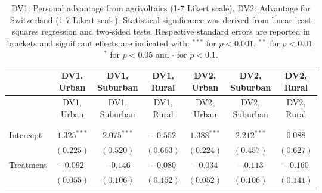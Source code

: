 
\begin{center}
\begin{small}
\begin{longtable}{l@{} c@{} c@{} c@{} c@{} c@{} c@{}}
\hline
 & \shortstack{\rule{0pt}{2.2ex}DV1,\\Urban} & \shortstack{\rule{0pt}{2.2ex}DV1,\\Suburban} & \shortstack{\rule{0pt}{2.2ex}DV1,\\Rural} & \shortstack{\rule{0pt}{2.2ex}DV2,\\Urban} & \shortstack{\rule{0pt}{2.2ex}DV2,\\Suburban} & \shortstack{\rule{0pt}{2.2ex}DV2,\\Rural} \\
\hline
\endfirsthead
\hline
 & \shortstack{\rule{0pt}{2.2ex}DV1,\\Urban} & \shortstack{\rule{0pt}{2.2ex}DV1,\\Suburban} & \shortstack{\rule{0pt}{2.2ex}DV1,\\Rural} & \shortstack{\rule{0pt}{2.2ex}DV2,\\Urban} & \shortstack{\rule{0pt}{2.2ex}DV2,\\Suburban} & \shortstack{\rule{0pt}{2.2ex}DV2,\\Rural} \\
\hline
\endhead
\hline
\endfoot
\hline
\multicolumn{7}{l}{\tiny{
}}\\
\caption{DV1: Personal advantage from agrivoltaics (1-7 Likert scale), DV2: Advantage for Switzerland (1-7 Likert scale). Statistical significance was derived from linear least squares regression and two-sided tests. Respective standard errors are reported in brackets and significant effects are indicated with: $^{***}$ for $p < 0.001$, $^{**}$ for $p < 0.01$, $^*$ for $p < 0.05$ and $\cdot$ for $p < 0.1$.}
\label{table:coefficients}
\endlastfoot \\
Intercept                           & $1.325^{***}$    & $2.075^{***}$ & $-0.552$      & $1.388^{***}$   & $2.212^{***}$  & $0.088$       \\
                                    & $(0.225)$        & $(0.520)$     & $(0.663)$     & $(0.224)$       & $(0.457)$      & $(0.627)$     \\
Treatment                           & $-0.092^{\cdot}$ & $-0.146$      & $-0.080$      & $-0.034$        & $-0.113$       & $-0.160$      \\
                                    & $(0.055)$        & $(0.106)$     & $(0.152)$     & $(0.052)$       & $(0.106)$      & $(0.141)$     \\

\end{longtable}
\end{small}
\end{center}
